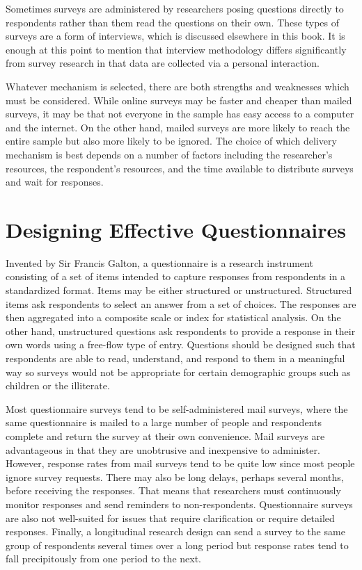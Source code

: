 Sometimes surveys are administered by researchers posing questions directly to respondents rather than them read the questions on their own. These types of surveys are a form of interviews, which is discussed elsewhere in this book. It is enough at this point to mention that interview methodology differs significantly from survey research in that data are collected via a personal interaction. 

Whatever mechanism is selected, there are both strengths and weaknesses which must be considered. While online surveys may be faster and cheaper than mailed surveys, it may be that not everyone in the sample has easy access to a computer and the internet. On the other hand, mailed surveys are more likely to reach the entire sample but also more likely to be ignored. The choice of which delivery mechanism is best depends on a number of factors including the researcher's resources, the respondent's resources, and the time available to distribute surveys and wait for responses.

\section{Designing Effective Questionnaires}

Invented by Sir Francis Galton, a questionnaire is a research instrument consisting of a set of items intended to capture responses from respondents in a standardized format. Items may be either structured or unstructured. Structured items ask respondents to select an answer from a set of choices. The responses are then aggregated into a composite scale or index for statistical analysis. On the other hand, unstructured questions ask respondents to provide a response in their own words using a free-flow type of entry. Questions should be designed such that respondents are able to read, understand, and respond to them in a meaningful way so surveys would not be appropriate for certain demographic groups such as children or the illiterate. 

Most questionnaire surveys tend to be self-administered mail surveys, where the same questionnaire is mailed to a large number of people and respondents complete and return the survey at their own convenience. Mail surveys are advantageous in that they are unobtrusive and inexpensive to administer. However, response rates from mail surveys tend to be quite low since most people ignore survey requests. There may also be long delays, perhaps several months, before receiving the responses. That means that researchers must continuously monitor responses and send reminders to non-respondents. Questionnaire surveys are also not well-suited for issues that require clarification or require detailed responses. Finally, a longitudinal research design can send a survey to the same group of respondents several times over a long period but response rates tend to fall precipitously from one period to the next.

